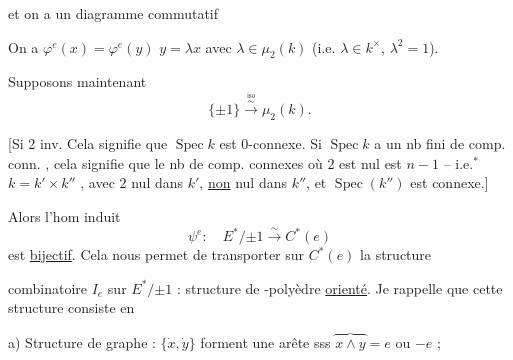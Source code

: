 et on a un  diagramme commutatif


On a $\varphi^e(x)=\varphi^e(y)$  $y=\lambda x$ avec $\lambda\in\mu_2(k)$ (i.e. $\lambda\in k^\times$, $\lambda^2=1$).

Supposons maintenant
\[
 \{\pm1\}\xrightarrow{\overset{\text{iso}}{\sim}}\mu_2(k).
\]

[Si 2 inv. Cela signifie que $\operatorname{Spec}k$ est 0-connexe. Si $\operatorname{Spec}k$ a un nb fini  de comp. conn. , cela signifie que  le nb de comp. connexes où $2$ est nul est $n-1$ -- i.e.$^*$ $k=k'\times k''$  , avec $2$ nul dans $k'$, \uline{non} nul dans $k''$, et $\operatorname{Spec}(k'')$ est  connexe.]


Alors l'hom induit
\[
 \psi^e:\quad E^*/{\pm1}\xrightarrow{\sim}C^*(e)
\]
est \uline{bijectif}. Cela nous permet de transporter sur $C^*(e)$ la structure

combinatoire $I_e$ sur $E^*/{\pm1}$ : structure de  -polyèdre \uline{orienté}. Je rappelle que cette structure consiste en

a) Structure de graphe : $\{\dot x,\dot y\}$ forment une arête  sss $\overbrace{x\wedge y}=e$ ou $-e$ ;

